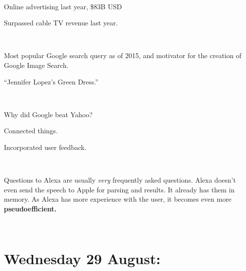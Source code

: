 \documentclass[11pt]{article}
\begin{document}
\begin{spacing}{1.2}
\

Online advertising last year, \$83B USD

Surpassed cable TV revenue last year.  

\

Most popular Google search query as of 2015, and motivator for the creation of Google Image Search.  

``Jennifer Lopez's Green Dress.''

\

Why did Google beat Yahoo?

Connected things.  

Incorporated user feedback.  

\

Questions to Alexa are usually {\it very} frequently asked questions.  Alexa doesn't even send the speech to Apple for parsing and results.  It already has them in memory.  As Alexa has more experience with the user, it becomes even more {\bf pseudoefficient.}

\

\section{Wednesday 29 August:  }


\end{spacing}
\end{document}

